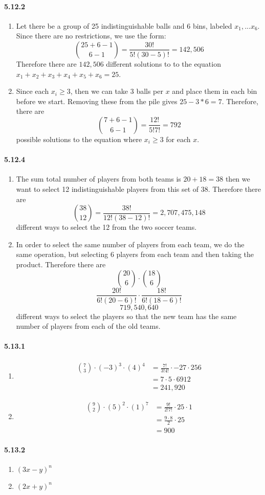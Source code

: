 \documentclass[11pt, letterpaper, twocolumn, fleqn]{article}
\begin{document}
\paragraph{5.12.2}
\begin{enumerate}
  \item Let there be a group of 25 indistinguishable balls and 6 bins, labeled $x_1, ... x_6$. Since there are no restrictions, we use the form:
    $$\binom{25+6-1}{6-1} = \frac{30!}{5!(30-5)!} = 142,506$$
  Therefore there are $142,506$ different solutions to to the equation $x_1+x_2+x_3+x_4+x_5+x_6=25$.
  \item Since each $x_i \geq 3$, then we can take 3 balls per $x$ and place them in each bin before we start. Removing these from the pile gives $25-3*6=7$.  Therefore, there are 
    $$\binom{7+6-1}{6-1} = \frac{12!}{5!7!} = 792$$
  possible solutions to the equation where $x_i \geq 3$ for each $x$.
\end{enumerate}

\paragraph{5.12.4}
\begin{enumerate}
  \item The sum total number of players from both teams is $20+18=38$ then we want to select 12 indistinguishable players from this set of 38. Therefore there are
    $$\binom{38}{12} = \frac{38!}{12!(38-12)!} = 2,707,475,148$$
  different ways to select the 12 from the two soccer teams.
  \item In order to select the same number of players from each team, we do the same operation, but selecting 6 players from each team and then taking the product. Therefore there are
    $$\binom{20}{6} \cdot \binom{18}{6}$$
    $$\frac{20!}{6!(20-6)!} \cdot \frac{18!}{6!(18-6)!}$$
    $$719,540,640$$
  different ways to select the players so that the new team has the same number of players from each of the old teams.
\end{enumerate}

\paragraph{5.13.1}
\begin{enumerate}
  \item
  \begin{align*}
    \binom{7}{3} \cdot (-3)^3 \cdot (4)^4 &= \frac{7!}{3!4!} \cdot -27 \cdot 256  \\
      &= 7 \cdot 5 \cdot 6912 \\
      &= 241,920
  \end{align*}
  \item
  \begin{align*}
    \binom{9}{2} \cdot (5)^2 \cdot (1)^7 &= \frac{9!}{2!7!} \cdot 25 \cdot 1  \\
      &= \frac{9 \cdot 8}{2} \cdot 25 \\
      &= 900
  \end{align*}
\end{enumerate}

\paragraph{5.13.2}
\begin{enumerate}
  \item $(3x-y)^n$
  \item $(2x+y)^n$
\end{enumerate}
\end{document}
